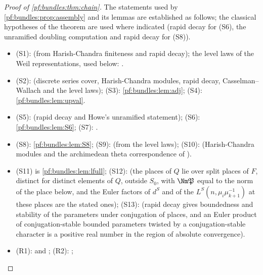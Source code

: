 \begin{proof}[Proof of \cref{pf:bundles:thm:chain}]
The statements used by \cref{pf:bundles:prop:assembly} and its lemmas are established as follows; the classical hypotheses of the theorem are
used where indicated (rapid decay for (S6), the unramified doubling computation and rapid decay for (S8)).
\begin{itemize}
\item (S1):  (from Harish-Chandra finiteness and rapid decay); the level laws of the
Weil representations, used below: .
\item (S2):  (discrete series cover, Harish-Chandra modules, rapid decay, Casselman--Wallach
and the level laws); (S3): \cref{pf:bundles:lem:adj}; (S4): \cref{pf:bundles:lem:upval}.
\item (S5):  (rapid decay and Howe's unramified statement); (S6):
\cref{pf:bundles:lem:S6}; (S7): .
\item (S8): \cref{pf:bundles:lem:S8}; (S9):  (from the level
laws); (S10):  (Harish-Chandra modules and the archimedean theta correspondence of
).
\item (S11) is \cref{pf:bundles:lem:lfull}; (S12):  (the places of $Q$ lie over split
places of $F$, distinct for distinct elements of $Q$, outside $S_0$, with $\Nm\mathfrak P$ equal to the norm of the place below, and the Euler
factors of $d^S$ and of the $L^S(n,\mu_i\mu_{k+1}^{-1})$ at these places are the stated ones); (S13):
 (rapid decay gives boundedness and stability of the parameters under conjugation of
places, and an Euler product of conjugation-stable bounded parameters twisted by a conjugation-stable character is a positive real number in the
region of absolute convergence).
\item (R1):  and
; (R2): ;

\end{itemize}
\end{proof}
